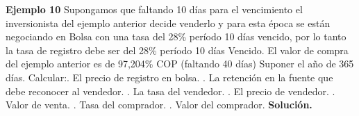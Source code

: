 \newpage
	\textbf{Ejemplo 10}\newline
Supongamos que faltando 10 días para el vencimiento el inversionista del ejemplo anterior decide venderlo y para esta época se están negociando en Bolsa con una tasa del 28\% período 10 días vencido, por lo tanto la tasa de registro debe ser del 28\% período 10 días Vencido. El valor de compra del ejemplo anterior es de 97,204\% COP (faltando 40 días) Suponer el año de 365 días. Calcular:. El precio de registro en bolsa. . La retención en la fuente que debe reconocer al vendedor. . La tasa del vendedor. . El precio de vendedor. . Valor de venta.  . Tasa del comprador. . Valor del comprador. \newline
\newline
\textbf{Solución.}

